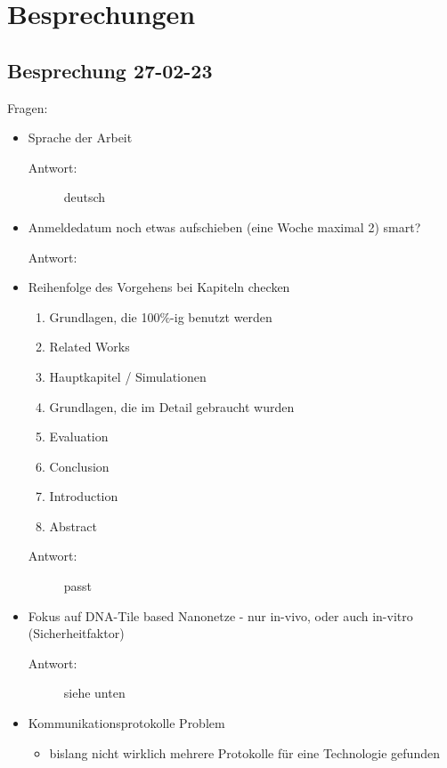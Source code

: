 \chapter{Besprechungen}

\section{Besprechung 27-02-23}
Fragen:
\begin{itemize}
  \item Sprache der Arbeit
  \begin{description}
    \item[Antwort: ] deutsch
  \end{description}
  \item Anmeldedatum noch etwas aufschieben (eine Woche maximal 2) smart?
  \begin{description}
    \item[Antwort: ]
  \end{description}
  \item Reihenfolge des Vorgehens bei Kapiteln checken
  \begin{enumerate}
    \item Grundlagen, die 100$\%$-ig benutzt werden
    \item Related Works
    \item Hauptkapitel / Simulationen
    \item Grundlagen, die im Detail gebraucht wurden
    \item Evaluation
    \item Conclusion
    \item Introduction
    \item Abstract
  \end{enumerate}
  \begin{description}
    \item[Antwort: ] passt
  \end{description}
  \item Fokus auf DNA-Tile based Nanonetze - nur in-vivo, oder auch in-vitro (Sicherheitfaktor)
  \begin{description}
    \item[Antwort: ] siehe unten
  \end{description}
  \item Kommunikationsprotokolle Problem
  \begin{itemize}
    \item bislang nicht wirklich mehrere Protokolle für eine Technologie gefunden

\end{itemize}
\end{itemize}
